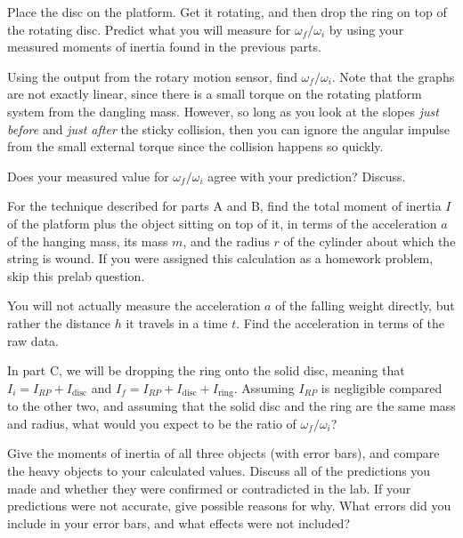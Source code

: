Place the disc on the platform. Get it rotating, and then drop the
ring on top of the rotating disc. Predict what you will measure for
$\omega_f / \omega_i$ by using your measured moments of inertia found
in the previous parts. 

Using the output from the rotary motion sensor, find $\omega_f /
\omega_i$. Note that the graphs are not exactly linear, since there is
a small torque on the rotating platform system from the dangling mass.
However, so long as you look at the slopes \emph{just before} and
\emph{just after} the sticky collision, then you can ignore the
angular impulse from the small external torque since the collision
happens so quickly. 

Does your measured value for $\omega_f / \omega_i$ agree with your prediction? Discuss.

\prelab

\prelabquestion For the technique described for parts A and B, 
find the total moment of inertia
$I$ of the platform plus the object sitting on top of it, in terms
of the acceleration $a$ of the hanging mass, its mass $m$, and the radius
$r$ of the cylinder about which the string is wound. If you were assigned
this calculation as a homework problem, skip this prelab question.

\prelabquestion You will not actually measure the acceleration $a$
of the falling weight directly, but rather the distance $h$ it travels
in a time $t$. Find the acceleration in terms of the raw data.

\prelabquestion In part C, we will be dropping the ring onto the solid
disc, meaning that $I_i = I_{RP}+I_\text{disc}$ and $I_f =
I_{RP}+I_\text{disc}+I_\text{ring}$. Assuming $I_{RP}$ is negligible
compared to the other two, and assuming that the solid disc and the
ring are the same mass and radius, what would you expect to be the
ratio of $\omega_f / \omega_i$? 

\analysis

Give the moments of inertia of all three objects (with error bars),
and compare the heavy objects to your calculated values. Discuss all
of the predictions you made and whether they were confirmed or
contradicted in the lab. If your predictions were not accurate, give
possible reasons for why. What errors did you include in your error
bars, and what effects were not included? 
